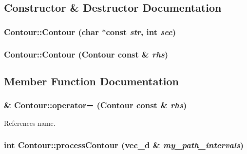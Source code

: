 \subsection{Constructor \& Destructor Documentation}
\hypertarget{classContour_7b0cf79d396376bb151107ea681bcc8c}{
\subsubsection[Contour]{\setlength{\rightskip}{0pt plus 5cm}Contour::Contour (char $\ast$const  {\em str}, \/  int {\em sec})}}
\label{classContour_7b0cf79d396376bb151107ea681bcc8c}


\hypertarget{classContour_c932ba1508409956282d1c0edc33b423}{
\subsubsection[Contour]{\setlength{\rightskip}{0pt plus 5cm}Contour::Contour ({\bf Contour} const \& {\em rhs})}}
\label{classContour_c932ba1508409956282d1c0edc33b423}




\subsection{Member Function Documentation}
\hypertarget{classContour_43544e1600bf1ad9089280acf0d00f49}{
\subsubsection[operator=]{ \& Contour::operator= ({\bf Contour} const \& {\em rhs})}}
\label{classContour_43544e1600bf1ad9089280acf0d00f49}




References name.\hypertarget{classContour_e6c12c88060f02914f324d3c446ea536}{
\subsubsection[processContour]{\setlength{\rightskip}{0pt plus 5cm}int Contour::processContour ({\bf vec\_\-d} \& {\em my\_\-path\_\-intervals})}}
\label{classContour_e6c12c88060f02914f324d3c446ea536}


